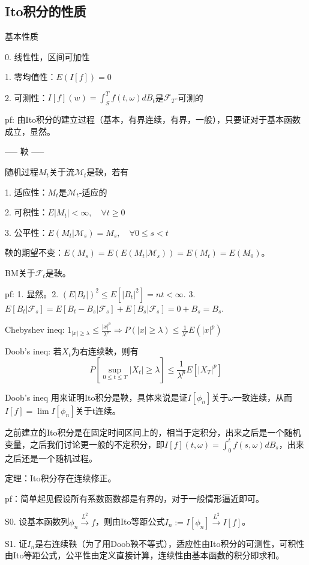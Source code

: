 \subsection{Ito积分的性质}

基本性质

0. 线性性，区间可加性

1. 零均值性：$E(I[f]) = 0$

2. 可测性：$I[f](w) = \int_S^T f(t, \omega) dB_t$是$\mathcal{F}_T$-可测的

pf: 由Ito积分的建立过程（基本，有界连续，有界，一般），只要证对于基本函数成立，显然。

----- 鞅 -----

随机过程$M_t$关于流$\mathcal{M}_t$是鞅，若有

1. 适应性：$M_t$是$\mathcal{M}_t$-适应的

2. 可积性：$E|M_t| < \infty, \quad \forall t \ge 0$

3. 公平性：$E(M_t | \mathcal{M}_s) = M_s, \quad  \forall 0 \le s < t$

鞅的期望不变：$E(M_s) = E(E(M_t | \mathcal{M}_s)) = E(M_t) = E(M_0)$。

BM关于$\mathcal{F}_t$是鞅。

pf: 1. 显然。2. $(E|B_{t}|)^{2} \le E[|B_{t}|^{2}]=nt<\infty$. 3. $E[B_{t} | \mathcal{F}_{s}]=E[B_{t}-B_{s} | \mathcal{F}_{s}]+E[B_{s} | \mathcal{F}_{s}]=0+B_{s}=B_{s}$.

Chebyshev ineq: $1_{|x| \ge \lambda} \le \frac{|x|^p}{\lambda^p} \Rightarrow P(|x| \ge \lambda) \le \frac{1}{\lambda^p} E(|x|^p)$

Doob's ineq: 若$X_t$为右连续鞅，则有
\[
  P\left[\sup_{0 \leq t \leq T}|X_{t}| \geq \lambda\right] \leq \frac{1}{\lambda^{p}} E\left[|X_{T}|^{p}\right]
\]

Doob's ineq 用来证明Ito积分是鞅，具体来说是证$I[\phi_n]$关于$\omega$一致连续，从而$I[f] = \lim I[\phi_n]$关于t连续。

之前建立的Ito积分是在固定时间区间上的，相当于定积分，出来之后是一个随机变量，之后我们讨论更一般的不定积分，即$I[f](t, \omega) = \int_0^t f(s, \omega) d B_{s}$，出来之后还是一个随机过程。

定理：Ito积分存在连续修正。

pf：简单起见假设所有系数函数都是有界的，对于一般情形逼近即可。

S0. 设基本函数列$\phi_n \overset{L^2}{\to} f$，则由Ito等距公式$I_n := I[\phi_n] \overset{L^2}{\to} I[f]$。

S1. 证$I_n$是右连续鞅（为了用Doob鞅不等式），适应性由Ito积分的可测性，可积性由Ito等距公式，公平性由定义直接计算，连续性由基本函数的积分即求和。


